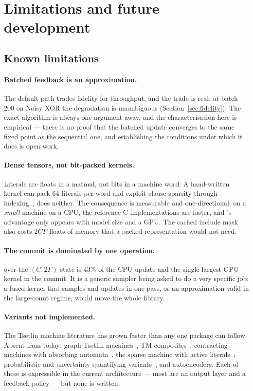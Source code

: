 \section{Limitations and future development}
\label{sec:limitations}

\subsection{Known limitations}

\paragraph{Batched feedback is an approximation.}
The default path trades fidelity for throughput, and the trade is real: at batch 200 on Noisy
XOR the degradation is unambiguous (Section~\ref{sec:fidelity}). The exact algorithm is always
one argument away, and the characterisation here is empirical --- there is no proof that the
batched update converges to the same fixed point as the sequential one, and establishing the
conditions under which it does is open work.

\paragraph{Dense tensors, not bit-packed kernels.}
Literals are floats in a matmul, not bits in a machine word. A hand-written kernel can pack 64
literals per word and exploit clause sparsity through indexing~; \ttlibname does
neither. The consequence is measurable and one-directional: on a \emph{small} machine on a
CPU, the reference C implementations are faster, and \ttlibname's advantage only appears with
model size and a GPU. The cached include mask also costs $2CF$ floats of memory that a packed
representation would not need.

\paragraph{The commit is dominated by one operation.}
 over the $(C,2F)$ state is 43\% of the CPU update and the single largest
GPU kernel in the commit. It is a generic sampler being asked to do a very specific job; a
fused kernel that samples and updates in one pass, or an approximation valid in the
large-count regime, would move the whole library.

\paragraph{Variants not implemented.}
The Tsetlin machine literature has grown faster than any one package can follow. Absent from
\ttlibname today: graph Tsetlin machines~, TM composites~, contracting
machines with absorbing automata~, the sparse machine with active
literals~, probabilistic and uncertainty-quantifying variants~, and
autoencoders. Each of these is expressible in the current architecture --- most are an output
layer and a feedback policy --- but none is written.

